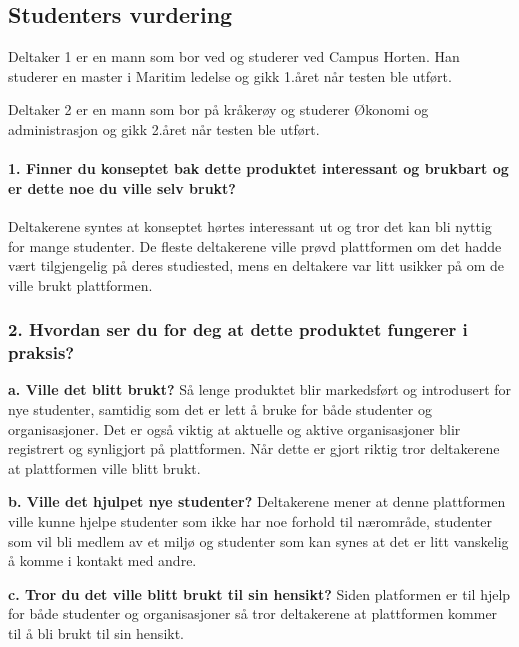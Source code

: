 \subsection{Studenters vurdering}
Deltaker 1 er en mann som bor ved og studerer ved Campus Horten. Han studerer en master i Maritim ledelse og gikk 1.året når testen ble utført.

Deltaker 2 er en mann som bor på kråkerøy og studerer Økonomi og administrasjon og gikk 2.året når testen ble utført. %
\paragraph{1. Finner du konseptet bak dette produktet interessant og brukbart og er dette noe du ville selv brukt?}
Deltakerene syntes at konseptet hørtes interessant ut og tror det kan bli nyttig for mange studenter. De fleste deltakerene ville prøvd plattformen om det hadde vært tilgjengelig på deres studiested, mens en deltakere var litt usikker på om de ville brukt plattformen.

\subsubsection{2. Hvordan ser du for deg at dette produktet fungerer i praksis?}

{\bf a. Ville det blitt brukt?}
Så lenge produktet blir markedsført og introdusert for nye studenter, samtidig som det er lett å bruke for både studenter og organisasjoner. Det er også viktig at aktuelle og aktive organisasjoner blir registrert og synligjort på plattformen. Når dette er gjort riktig tror deltakerene at plattformen ville blitt brukt. 

{\bf b. Ville det hjulpet nye studenter?}
Deltakerene mener at denne plattformen ville kunne hjelpe studenter som ikke har noe forhold til nærområde, studenter som vil bli medlem av et miljø og studenter som kan synes at det er litt vanskelig å komme i kontakt med andre.

{\bf c. Tror du det ville blitt brukt til sin hensikt?}
Siden platformen er til hjelp for både studenter og organisasjoner så tror deltakerene at plattformen kommer til å bli brukt til sin hensikt.


